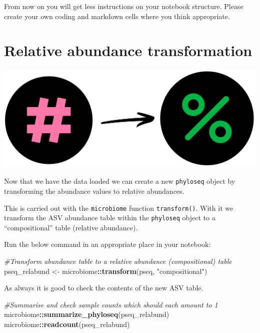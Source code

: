 \documentclass[
]{book}
\newenvironment{Shaded}{\begin{snugshade}}{\end{snugshade}}
\newcommand{\CommentTok}[1]{\textcolor[rgb]{0.56,0.35,0.01}{\textit{#1}}}
\newcommand{\FunctionTok}[1]{\textcolor[rgb]{0.13,0.29,0.53}{\textbf{#1}}}
\newcommand{\NormalTok}[1]{#1}
\newcommand{\OtherTok}[1]{\textcolor[rgb]{0.56,0.35,0.01}{#1}}
\newcommand{\SpecialCharTok}[1]{\textcolor[rgb]{0.81,0.36,0.00}{\textbf{#1}}}
\newcommand{\StringTok}[1]{\textcolor[rgb]{0.31,0.60,0.02}{#1}}
\begin{document}
From now on you will get less instructions on your notebook structure.
Please create your own coding and markdown cells where you think appropriate.

\hypertarget{relative-abundance-transformation}{%
\section{Relative abundance transformation}\label{relative-abundance-transformation}}

\includegraphics{figures/count_to_percent.png}

Now that we have the data loaded we can create a new \texttt{phyloseq} object by transforming the abundance values to relative abundances.

This is carried out with the \texttt{microbiome} function \texttt{transform()}. With it we transform the ASV abundance table within the \texttt{phyloseq} object to a ``compositional'' table (relative abundance).

Run the below command in an appropriate place in your notebook:

\begin{Shaded}
\begin{Highlighting}[]
\CommentTok{\#Transform abundance table to a relative abundance (compositional) table}
\NormalTok{pseq\_relabund }\OtherTok{\textless{}{-}}\NormalTok{ microbiome}\SpecialCharTok{::}\FunctionTok{transform}\NormalTok{(pseq, }\StringTok{"compositional"}\NormalTok{)}
\end{Highlighting}
\end{Shaded}

As always it is good to check the contents of the new ASV table.

\begin{Shaded}
\begin{Highlighting}[]
\CommentTok{\#Summarise and check sample counts which should each amount to 1}
\NormalTok{microbiome}\SpecialCharTok{::}\FunctionTok{summarize\_phyloseq}\NormalTok{(pseq\_relabund)}
\NormalTok{microbiome}\SpecialCharTok{::}\FunctionTok{readcount}\NormalTok{(pseq\_relabund)}
\end{Highlighting}
\end{Shaded}
\end{document}
